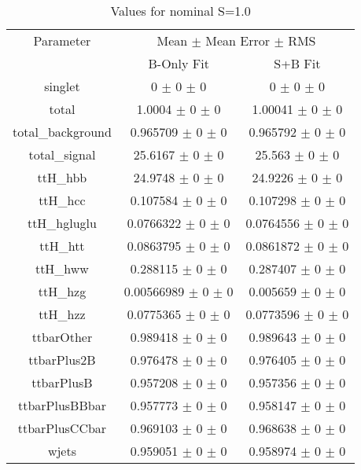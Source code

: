 \begin{table}
\centering
\caption{Values for nominal S=1.0}
\begin{tabular}{ccc}
\toprule
Parameter 	& \multicolumn{2}{c}{Mean $\pm$ Mean Error $\pm$ RMS}\\
 	& B-Only Fit & S+B Fit\\
\midrule
singlet 	& \num{0} $\pm$ \num{0} $\pm$ \num{0} 	& \num{0} $\pm$ \num{0} $\pm$ \num{0}\\
total 	& \num{1.0004} $\pm$ \num{0} $\pm$ \num{0} 	& \num{1.00041} $\pm$ \num{0} $\pm$ \num{0}\\
total\_background 	& \num{0.965709} $\pm$ \num{0} $\pm$ \num{0} 	& \num{0.965792} $\pm$ \num{0} $\pm$ \num{0}\\
total\_signal 	& \num{25.6167} $\pm$ \num{0} $\pm$ \num{0} 	& \num{25.563} $\pm$ \num{0} $\pm$ \num{0}\\
ttH\_hbb 	& \num{24.9748} $\pm$ \num{0} $\pm$ \num{0} 	& \num{24.9226} $\pm$ \num{0} $\pm$ \num{0}\\
ttH\_hcc 	& \num{0.107584} $\pm$ \num{0} $\pm$ \num{0} 	& \num{0.107298} $\pm$ \num{0} $\pm$ \num{0}\\
ttH\_hgluglu 	& \num{0.0766322} $\pm$ \num{0} $\pm$ \num{0} 	& \num{0.0764556} $\pm$ \num{0} $\pm$ \num{0}\\
ttH\_htt 	& \num{0.0863795} $\pm$ \num{0} $\pm$ \num{0} 	& \num{0.0861872} $\pm$ \num{0} $\pm$ \num{0}\\
ttH\_hww 	& \num{0.288115} $\pm$ \num{0} $\pm$ \num{0} 	& \num{0.287407} $\pm$ \num{0} $\pm$ \num{0}\\
ttH\_hzg 	& \num{0.00566989} $\pm$ \num{0} $\pm$ \num{0} 	& \num{0.005659} $\pm$ \num{0} $\pm$ \num{0}\\
ttH\_hzz 	& \num{0.0775365} $\pm$ \num{0} $\pm$ \num{0} 	& \num{0.0773596} $\pm$ \num{0} $\pm$ \num{0}\\
ttbarOther 	& \num{0.989418} $\pm$ \num{0} $\pm$ \num{0} 	& \num{0.989643} $\pm$ \num{0} $\pm$ \num{0}\\
ttbarPlus2B 	& \num{0.976478} $\pm$ \num{0} $\pm$ \num{0} 	& \num{0.976405} $\pm$ \num{0} $\pm$ \num{0}\\
ttbarPlusB 	& \num{0.957208} $\pm$ \num{0} $\pm$ \num{0} 	& \num{0.957356} $\pm$ \num{0} $\pm$ \num{0}\\
ttbarPlusBBbar 	& \num{0.957773} $\pm$ \num{0} $\pm$ \num{0} 	& \num{0.958147} $\pm$ \num{0} $\pm$ \num{0}\\
ttbarPlusCCbar 	& \num{0.969103} $\pm$ \num{0} $\pm$ \num{0} 	& \num{0.968638} $\pm$ \num{0} $\pm$ \num{0}\\
wjets 	& \num{0.959051} $\pm$ \num{0} $\pm$ \num{0} 	& \num{0.958974} $\pm$ \num{0} $\pm$ \num{0}\\
\bottomrule
\end{tabular}
\end{table}